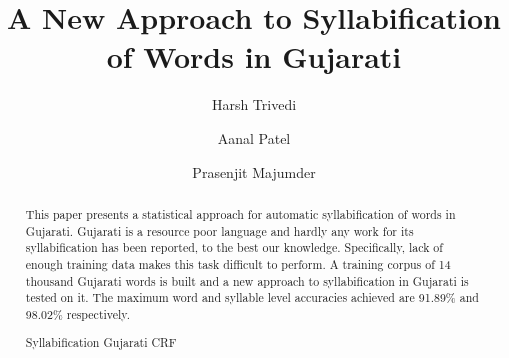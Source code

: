 \documentclass[runningheads,a4paper]{llncs}
\newcommand{\keywords}[1]{\par\addvspace\baselineskip
\noindent\keywordname\enspace\ignorespaces#1}
\begin{document}
\mainmatter  %

\title{A New Approach to Syllabification \\ of Words in Gujarati}


%
%
\author{ Harsh Trivedi \and Aanal Patel \and Prasenjit Majumder }
%


%
%

\maketitle


\begin{abstract}
This paper presents a statistical approach for automatic syllabification of words in Gujarati. Gujarati is a resource poor language and hardly any work for its syllabification has been reported, to the best our knowledge. Specifically, lack of enough training data makes this task difficult to perform. A training corpus of 14 thousand Gujarati words is built and a new approach to syllabification in Gujarati is tested on it. The maximum word and syllable level accuracies achieved are 91.89\% and 98.02\% respectively.
\keywords{ Syllabification Gujarati CRF}
\end{abstract}
\end{document}
